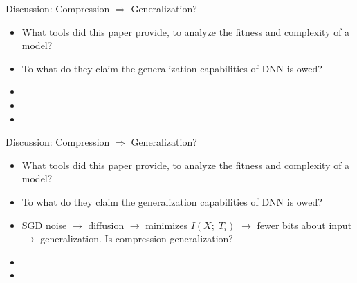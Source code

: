 \begin{frame}{Discussion: Compression $\Rightarrow$ Generalization?}

\begin{itemize}
    \item What tools did this paper provide, to analyze the fitness and complexity of a model?
    \item To what do they claim the generalization capabilities of DNN is owed?
    \item[-] 
    \item[-] 
    \item[-] 
\end{itemize}

\end{frame}

\begin{frame}{Discussion: Compression $\Rightarrow$ Generalization?}

\begin{itemize}
    \item What tools did this paper provide, to analyze the fitness and complexity of a model?
    \item To what do they claim the generalization capabilities of DNN is owed?
    \item SGD noise $\rightarrow$ diffusion $\rightarrow$ minimizes $I(X;\;T_i)$ $\rightarrow$ fewer bits about input $\rightarrow$ generalization.
    Is compression generalization?
    \item[-] 
    \item[-] 
\end{itemize}

\end{frame}

